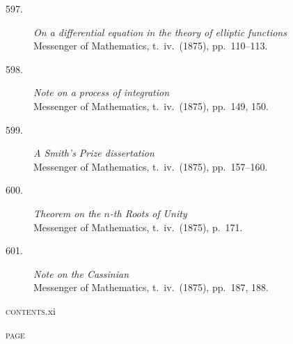 \documentclass[11pt]{article}
\begin{document}
\begin{description}
\item[597.] \textit{On a differential equation in the theory of elliptic functions}\\
\hspace*{1em}\small Messenger of Mathematics, t.~iv.\ (1875), pp.~110--113.

\item[598.] \textit{Note on a process of integration}\\
\hspace*{1em}\small Messenger of Mathematics, t.~iv.\ (1875), pp.~149, 150.

\item[599.] \textit{A Smith's Prize dissertation}\\
\hspace*{1em}\small Messenger of Mathematics, t.~iv.\ (1875), pp.~157--160.

\item[600.] \textit{Theorem on the $n$-th Roots of Unity}\\
\hspace*{1em}\small Messenger of Mathematics, t.~iv.\ (1875), p.~171.

\item[601.] \textit{Note on the Cassinian}\\
\hspace*{1em}\small Messenger of Mathematics, t.~iv.\ (1875), pp.~187, 188.
\end{description}
\newpage

\thispagestyle{empty}
\noindent\small\textsc{contents.}\hfill xi
\vspace*{1em}

\noindent\hfill\textsc{page}

\medskip
\end{document}
